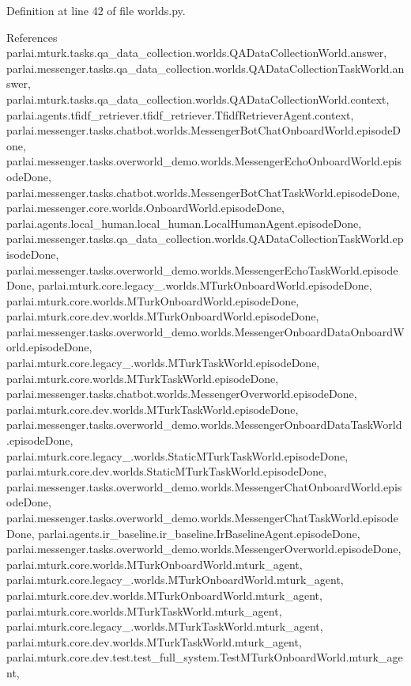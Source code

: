 Definition at line 42 of file worlds.\+py.



References parlai.\+mturk.\+tasks.\+qa\+\_\+data\+\_\+collection.\+worlds.\+Q\+A\+Data\+Collection\+World.\+answer, parlai.\+messenger.\+tasks.\+qa\+\_\+data\+\_\+collection.\+worlds.\+Q\+A\+Data\+Collection\+Task\+World.\+answer, parlai.\+mturk.\+tasks.\+qa\+\_\+data\+\_\+collection.\+worlds.\+Q\+A\+Data\+Collection\+World.\+context, parlai.\+agents.\+tfidf\+\_\+retriever.\+tfidf\+\_\+retriever.\+Tfidf\+Retriever\+Agent.\+context, parlai.\+messenger.\+tasks.\+chatbot.\+worlds.\+Messenger\+Bot\+Chat\+Onboard\+World.\+episode\+Done, parlai.\+messenger.\+tasks.\+overworld\+\_\+demo.\+worlds.\+Messenger\+Echo\+Onboard\+World.\+episode\+Done, parlai.\+messenger.\+tasks.\+chatbot.\+worlds.\+Messenger\+Bot\+Chat\+Task\+World.\+episode\+Done, parlai.\+messenger.\+core.\+worlds.\+Onboard\+World.\+episode\+Done, parlai.\+agents.\+local\+\_\+human.\+local\+\_\+human.\+Local\+Human\+Agent.\+episode\+Done, parlai.\+messenger.\+tasks.\+qa\+\_\+data\+\_\+collection.\+worlds.\+Q\+A\+Data\+Collection\+Task\+World.\+episode\+Done, parlai.\+messenger.\+tasks.\+overworld\+\_\+demo.\+worlds.\+Messenger\+Echo\+Task\+World.\+episode\+Done, parlai.\+mturk.\+core.\+legacy\+\_.\+worlds.\+M\+Turk\+Onboard\+World.\+episode\+Done, parlai.\+mturk.\+core.\+worlds.\+M\+Turk\+Onboard\+World.\+episode\+Done, parlai.\+mturk.\+core.\+dev.\+worlds.\+M\+Turk\+Onboard\+World.\+episode\+Done, parlai.\+messenger.\+tasks.\+overworld\+\_\+demo.\+worlds.\+Messenger\+Onboard\+Data\+Onboard\+World.\+episode\+Done, parlai.\+mturk.\+core.\+legacy\+\_.\+worlds.\+M\+Turk\+Task\+World.\+episode\+Done, parlai.\+mturk.\+core.\+worlds.\+M\+Turk\+Task\+World.\+episode\+Done, parlai.\+messenger.\+tasks.\+chatbot.\+worlds.\+Messenger\+Overworld.\+episode\+Done, parlai.\+mturk.\+core.\+dev.\+worlds.\+M\+Turk\+Task\+World.\+episode\+Done, parlai.\+messenger.\+tasks.\+overworld\+\_\+demo.\+worlds.\+Messenger\+Onboard\+Data\+Task\+World.\+episode\+Done, parlai.\+mturk.\+core.\+legacy\+\_.\+worlds.\+Static\+M\+Turk\+Task\+World.\+episode\+Done, parlai.\+mturk.\+core.\+dev.\+worlds.\+Static\+M\+Turk\+Task\+World.\+episode\+Done, parlai.\+messenger.\+tasks.\+overworld\+\_\+demo.\+worlds.\+Messenger\+Chat\+Onboard\+World.\+episode\+Done, parlai.\+messenger.\+tasks.\+overworld\+\_\+demo.\+worlds.\+Messenger\+Chat\+Task\+World.\+episode\+Done, parlai.\+agents.\+ir\+\_\+baseline.\+ir\+\_\+baseline.\+Ir\+Baseline\+Agent.\+episode\+Done, parlai.\+messenger.\+tasks.\+overworld\+\_\+demo.\+worlds.\+Messenger\+Overworld.\+episode\+Done, parlai.\+mturk.\+core.\+worlds.\+M\+Turk\+Onboard\+World.\+mturk\+\_\+agent, parlai.\+mturk.\+core.\+legacy\+\_.\+worlds.\+M\+Turk\+Onboard\+World.\+mturk\+\_\+agent, parlai.\+mturk.\+core.\+dev.\+worlds.\+M\+Turk\+Onboard\+World.\+mturk\+\_\+agent, parlai.\+mturk.\+core.\+worlds.\+M\+Turk\+Task\+World.\+mturk\+\_\+agent, parlai.\+mturk.\+core.\+legacy\+\_.\+worlds.\+M\+Turk\+Task\+World.\+mturk\+\_\+agent, parlai.\+mturk.\+core.\+dev.\+worlds.\+M\+Turk\+Task\+World.\+mturk\+\_\+agent, parlai.\+mturk.\+core.\+dev.\+test.\+test\+\_\+full\+\_\+system.\+Test\+M\+Turk\+Onboard\+World.\+mturk\+\_\+agent, 